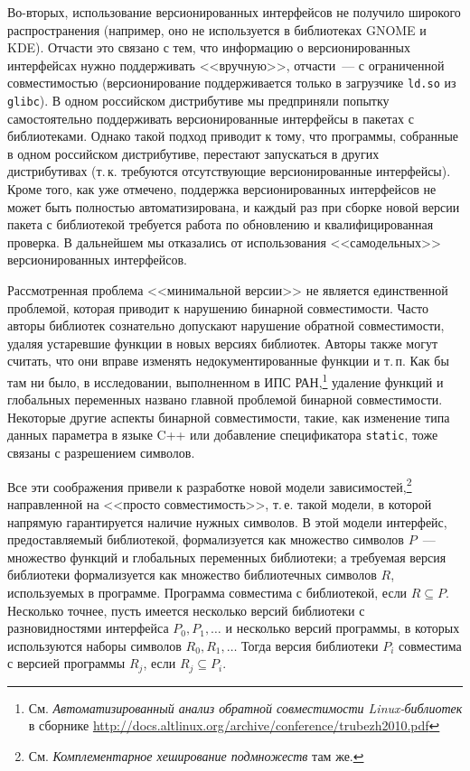 \documentclass[russian,a4paper,12pt,titlepage]{article}
\begin{document}
Во-вторых, использование версионированных интерфейсов не получило широкого распространения (например, оно не используется
в библиотеках GNOME и KDE).  Отчасти это связано с тем, что информацию о версионированных интерфейсах нужно поддерживать <<вручную>>,
отчасти~--- с ограниченной совместимостью (версионирование поддерживается только в загрузчике \verb|ld.so| из \verb|glibc|).
В одном российском дистрибутиве мы предприняли попытку самостоятельно поддерживать версионированные интерфейсы в пакетах
с библиотеками.  Однако такой подход приводит к тому, что программы, собранные в одном российском дистрибутиве, перестают
запускаться в других дистрибутивах (т.\,к. требуются отсутствующие версионированные интерфейсы).  Кроме того, как уже отмечено,
поддержка версионированных интерфейсов не может быть полностью автоматизирована, и каждый раз при сборке новой версии пакета
с библиотекой требуется работа по обновлению и квалифицированная проверка.
В дальнейшем мы отказались от использования <<самодельных>> версионированных интерфейсов.

Рассмотренная проблема <<минимальной версии>> не является единственной проблемой, которая приводит к нарушению бинарной совместимости.
Часто авторы библиотек сознательно допускают нарушение обратной совместимости, удаляя устаревшие функции в новых версиях библиотек.
Авторы также могут считать, что они вправе изменять недокументированные функции и т.\,п.  Как бы там ни было, в исследовании,
выполненном в ИПС РАН,\footnote{См. \textsl{Автоматизированный анализ обратной совместимости Linux-библиотек} в сборнике
\url{http://docs.altlinux.org/archive/conference/trubezh2010.pdf}} удаление функций и глобальных переменных названо
главной проблемой бинарной совместимости.  Некоторые другие аспекты бинарной совместимости, такие, как изменение типа данных
параметра в языке C++ или добавление спецификатора \verb|static|, тоже связаны с разрешением символов.

Все эти соображения привели к разработке новой модели зависимостей,\footnote{См. \textsl{Комплементарное хеширование подмножеств} там же.}
направленной на <<просто совместимость>>, т.\,е. такой модели, в которой напрямую гарантируется наличие нужных символов.  В этой модели
интерфейс, предоставляемый библиотекой, формализуется как множество символов $P$~--- множество функций и глобальных переменных библиотеки;
а требуемая версия библиотеки формализуется как множество библиотечных символов $R$, используемых в программе.  Программа совместима
с библиотекой, если $R\subseteq P$.  Несколько точнее, пусть имеется несколько версий библиотеки с разновидностями интерфейса
$P_0,P_1,\ldots$ и несколько версий программы, в которых используются наборы символов $R_0,R_1,\ldots$  Тогда версия библиотеки $P_i$
совместима с версией программы $R_j$, если $R_j\subseteq P_i$.
\end{document}
